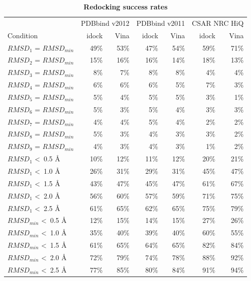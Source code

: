 \documentclass[10pt]{article}
\begin{document}
\begin{table}[!ht]
\caption{
\bf{Redocking success rates}}
\begin{tabular}{lrrrrrr}
\hline
& \multicolumn{2}{c}{PDBbind v2012} & \multicolumn{2}{c}{PDBbind v2011} & \multicolumn{2}{c}{CSAR NRC HiQ}\\
Condition & idock & Vina & idock & Vina & idock & Vina\\
\hline
$RMSD_1$ = $RMSD_{min}$ & 49\% & 53\% & 47\% & 54\% & 59\% & 71\%\\
$RMSD_2$ = $RMSD_{min}$ & 15\% & 16\% & 16\% & 14\% & 18\% & 13\%\\
$RMSD_3$ = $RMSD_{min}$ &  8\% &  7\% &  8\% &  8\% &  4\% &  4\%\\
$RMSD_4$ = $RMSD_{min}$ &  6\% &  6\% &  6\% &  5\% &  7\% &  3\%\\
$RMSD_5$ = $RMSD_{min}$ &  5\% &  4\% &  5\% &  5\% &  3\% &  1\%\\
$RMSD_6$ = $RMSD_{min}$ &  5\% &  3\% &  5\% &  4\% &  3\% &  3\%\\
$RMSD_7$ = $RMSD_{min}$ &  4\% &  4\% &  5\% &  4\% &  2\% &  2\%\\
$RMSD_8$ = $RMSD_{min}$ &  5\% &  3\% &  4\% &  3\% &  3\% &  2\%\\
$RMSD_9$ = $RMSD_{min}$ &  4\% &  3\% &  4\% &  3\% &  1\% &  2\%\\
\noalign{\smallskip}
$RMSD_1$ \textless\ 0.5 \AA & 10\% & 12\% & 11\% & 12\% & 20\% & 21\%\\
$RMSD_1$ \textless\ 1.0 \AA & 26\% & 31\% & 29\% & 31\% & 45\% & 47\%\\
$RMSD_1$ \textless\ 1.5 \AA & 43\% & 47\% & 45\% & 47\% & 61\% & 67\%\\
$RMSD_1$ \textless\ 2.0 \AA & 56\% & 60\% & 57\% & 59\% & 71\% & 75\%\\
$RMSD_1$ \textless\ 2.5 \AA & 61\% & 65\% & 62\% & 65\% & 75\% & 79\%\\
\noalign{\smallskip}
$RMSD_{min}$ \textless\ 0.5 \AA & 12\% & 15\% & 14\% & 15\% & 27\% & 26\%\\
$RMSD_{min}$ \textless\ 1.0 \AA & 35\% & 40\% & 39\% & 40\% & 60\% & 55\%\\
$RMSD_{min}$ \textless\ 1.5 \AA & 61\% & 65\% & 64\% & 65\% & 82\% & 84\%\\
$RMSD_{min}$ \textless\ 2.0 \AA & 72\% & 79\% & 74\% & 78\% & 88\% & 92\%\\
$RMSD_{min}$ \textless\ 2.5 \AA & 77\% & 85\% & 80\% & 84\% & 91\% & 94\%\\
\end{tabular}

\end{table}
\end{document}
